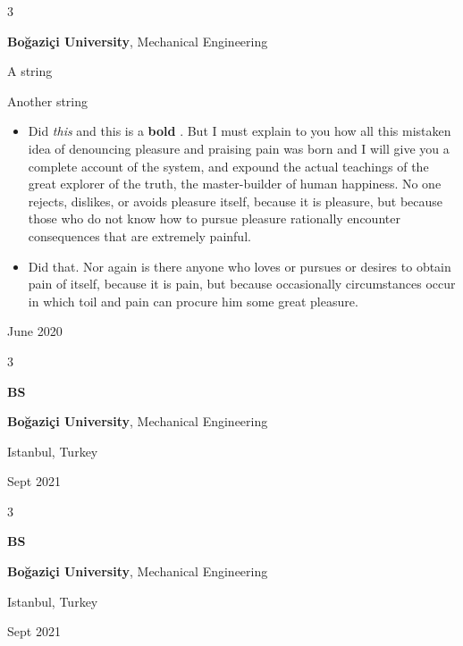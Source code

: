 \documentclass[10pt, letterpaper]{article}
\newenvironment{summary}{
    \begin{description}[
        topsep=0.10 cm,
        parsep=0.10 cm,
        partopsep=0pt,
        itemsep=0pt,
        leftmargin=0.4 cm + 10pt
    ]
}{
    \end{description}
} %
\newenvironment{highlights}{
    \begin{itemize}[
        topsep=0.10 cm,
        parsep=0.10 cm,
        partopsep=0pt,
        itemsep=0pt,
        leftmargin=0.4 cm + 10pt
    ]
}{
    \end{itemize}
} %
\newenvironment{threecolentry}[3][]{
    \onecolentry
    \def\thirdColumn{#3}
    \setcolumnwidth{1 cm, \fill, 4.5 cm}
    \begin{paracol}{3}
    {\raggedright #2} \switchcolumn
}{
    \switchcolumn \raggedleft \thirdColumn
    \end{paracol}
    \endonecolentry
} %
\let\hrefWithoutArrow\href
\renewcommand{\href}[2]{\hrefWithoutArrow{#1}{\ifthenelse{\equal{#2}{}}{ }{#2 }\raisebox{.15ex}{\footnotesize \faExternalLink*}}}
\begin{document}
        \vspace{0.2 cm}

        \begin{threecolentry}{\textbf{}}{
            June 2020
        }
            \textbf{Boğaziçi University}, Mechanical Engineering
            \begin{summary}
                \item A string
                \item Another string
            \end{summary}
            \begin{highlights}
                \item Did \textit{this} and this is a \textbf{bold} \href{https://example.com}{link}. But I must explain to you how all this mistaken idea of denouncing pleasure and praising pain was born and I will give you a complete account of the system, and expound the actual teachings of the great explorer of the truth, the master-builder of human happiness. No one rejects, dislikes, or avoids pleasure itself, because it is pleasure, but because those who do not know how to pursue pleasure rationally encounter consequences that are extremely painful.
                \item Did that. Nor again is there anyone who loves or pursues or desires to obtain pain of itself, because it is pain, but because occasionally circumstances occur in which toil and pain can procure him some great pleasure.
            \end{highlights}
        \end{threecolentry}

        \vspace{0.2 cm}

        \begin{threecolentry}{\textbf{BS}}{
            Istanbul, Turkey

        Sept 2021
        }
            \textbf{Boğaziçi University}, Mechanical Engineering
        \end{threecolentry}

        \vspace{0.2 cm}

        \begin{threecolentry}{\textbf{BS}}{
            Istanbul, Turkey

        Sept 2021
        }
            \textbf{Boğaziçi University}, Mechanical Engineering
        \end{threecolentry}
\end{document}
